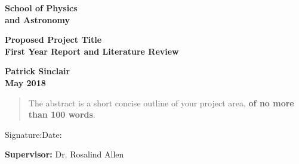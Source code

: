 \documentclass[a4paper,12pt]{article}
\begin{document}
\begin{minipage}[b]{110mm}
        {\Huge\bf School of Physics \\and Astronomy
        \vspace*{17mm}}
\end{minipage}
\hfill
\begin{minipage}[t]{40mm}               
\end{minipage}
\par\noindent                                           %
\vspace*{2cm}
\begin{center}
        \Large\bf Proposed Project Title\\
        \Large\bf First Year Report and Literature Review
\end{center}
\vspace*{1.5cm}
\begin{center}
        \bf Patrick Sinclair\\                 %
        May 2018                          %
\end{center}
\vspace*{5mm}
%
%                       
\begin{abstract}
        The abstract is a short concise outline of your 
        project area, {\bf of no more than 100 words}.
\end{abstract}

\vspace*{1cm}

\vspace*{3cm}
Signature:\hspace*{8cm}Date:

\vfill
{\bf Supervisor:} Dr. Rosalind Allen                %
\newpage
\setcounter{page}{1}                            %
\footruleheight{1pt}
\headruleheight{1pt}
\rhead{- \thepage}
\cfoot{}
%
\tableofcontents                                %
\end{document}
